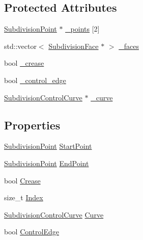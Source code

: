 \subsection*{Protected Attributes}
\begin{DoxyCompactItemize}
\item 
\hyperlink{classShipCADGeometry_1_1SubdivisionPoint}{Subdivision\-Point} $\ast$ \hyperlink{classShipCADGeometry_1_1SubdivisionEdge_a1df486b149723fe19190b178897f9a27}{\-\_\-points} \mbox{[}2\mbox{]}
\item 
std\-::vector$<$ \hyperlink{classShipCADGeometry_1_1SubdivisionFace}{Subdivision\-Face} $\ast$ $>$ \hyperlink{classShipCADGeometry_1_1SubdivisionEdge_af74c555a9f1e520c8a7092819182c565}{\-\_\-faces}
\item 
bool \hyperlink{classShipCADGeometry_1_1SubdivisionEdge_ae098b2abe43d484178e743a4e0ee2dd1}{\-\_\-crease}
\item 
bool \hyperlink{classShipCADGeometry_1_1SubdivisionEdge_a0253d92464fa44ece75199bafc2ab604}{\-\_\-control\-\_\-edge}
\item 
\hyperlink{classShipCADGeometry_1_1SubdivisionControlCurve}{Subdivision\-Control\-Curve} $\ast$ \hyperlink{classShipCADGeometry_1_1SubdivisionEdge_ae3d4de49a5c6b332d52a6c4e98704183}{\-\_\-curve}
\end{DoxyCompactItemize}
\subsection*{Properties}
\begin{DoxyCompactItemize}
\item 
\hyperlink{classShipCADGeometry_1_1SubdivisionPoint}{Subdivision\-Point} \hyperlink{classShipCADGeometry_1_1SubdivisionEdge_add30db0d6a7aac1c8f081012f3cccf03}{Start\-Point}
\item 
\hyperlink{classShipCADGeometry_1_1SubdivisionPoint}{Subdivision\-Point} \hyperlink{classShipCADGeometry_1_1SubdivisionEdge_aaec4f19ba8274a3b501a06fedb0658cb}{End\-Point}
\item 
bool \hyperlink{classShipCADGeometry_1_1SubdivisionEdge_ab36f0260a63d4ca62c45feddf96f8505}{Crease}
\item 
size\-\_\-t \hyperlink{classShipCADGeometry_1_1SubdivisionEdge_a5d959fb5043fcad1c24e603b50e9fa95}{Index}
\item 
\hyperlink{classShipCADGeometry_1_1SubdivisionControlCurve}{Subdivision\-Control\-Curve} \hyperlink{classShipCADGeometry_1_1SubdivisionEdge_abdc110088d3e486395a31dd7c7328dd4}{Curve}
\item 
bool \hyperlink{classShipCADGeometry_1_1SubdivisionEdge_a2b11b00bcc223691e6e00c4b8db272b6}{Control\-Edge}
\end{DoxyCompactItemize}



